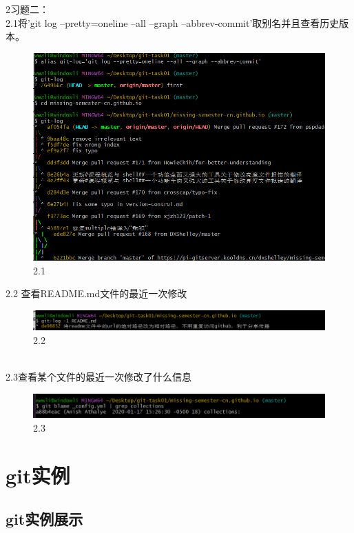 \documentclass[a4paper, 12pt]{article}
\begin{document}
 2习题二：\\
   2.1\quad 将'git log --pretty=oneline --all --graph --abbrev-commit'取别名并且查看历史版本。
   \begin{figure}[H]
  \centering
  \includegraphics[width=1\textwidth]{屏幕截图 2024-08-28 164831.png}
  \caption{2.1}
    \end{figure}
2.2 \quad 查看README.md文件的最近一次修改
\begin{figure}[H]
  \centering
  \includegraphics[width=1\textwidth]{屏幕截图 2024-08-28 165007.png}
  \caption{2.2}
    \end{figure}
    \\

    2.3\quad 查看某个文件的最近一次修改了什么信息
\begin{figure}[H]
  \centering
  \includegraphics[width=1\textwidth]{屏幕截图 2024-08-28 165107.png}
  \caption{2.3}
    \end{figure}

\section{git实例}
\subsection{git实例展示}
\end{document}
